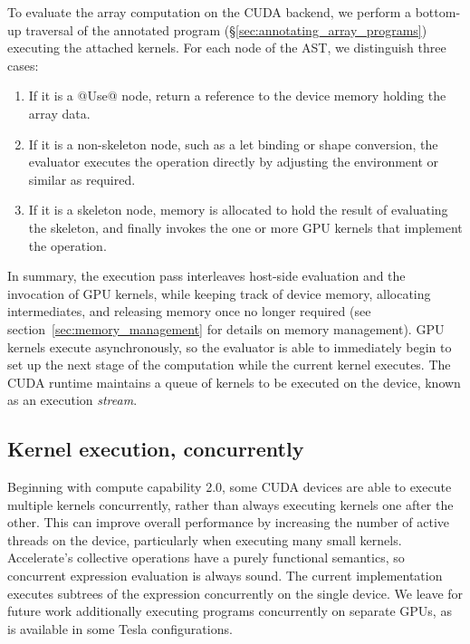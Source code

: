 To evaluate the array computation on the CUDA backend, we perform a bottom-up
traversal of the annotated program (\S\ref{sec:annotating_array_programs})
executing the attached kernels. For each node of the AST, we distinguish three
cases:
%
\begin{enumerate}
\item If it is a @Use@ node, return a reference to the device memory holding the
    array data.

\item If it is a non-skeleton node, such as a let binding or shape conversion,
    the evaluator executes the operation directly by adjusting the environment
    or similar as required.

\item If it is a skeleton node, memory is allocated to hold the result of
    evaluating the skeleton, and finally invokes the one or more GPU kernels
    that implement the operation.
\end{enumerate}
%
In summary, the execution pass interleaves host-side evaluation and the
invocation of GPU kernels, while keeping track of device memory, allocating
intermediates, and releasing memory once no longer required (see
section~\ref{sec:memory_management} for details on memory management). GPU
kernels execute asynchronously, so the evaluator is able to immediately begin to
set up the next stage of the computation while the current kernel executes. The
CUDA runtime maintains a queue of kernels to be executed on the device, known as
an execution \emph{stream}.

\subsection{Kernel execution, concurrently}

Beginning with compute capability 2.0, some CUDA devices are able to execute
multiple kernels concurrently, rather than always executing kernels one after
the other. This can improve overall performance by increasing the number of
active threads on the device, particularly when executing many small kernels.
Accelerate's collective operations have a purely functional semantics, so
concurrent expression evaluation is always sound. The current implementation
executes subtrees of the expression concurrently on the single device. We leave
for future work additionally executing programs concurrently on separate GPUs,
as is available in some Tesla configurations.

